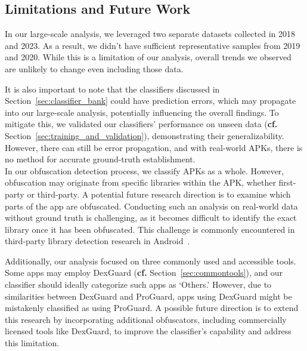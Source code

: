 \subsection{Limitations and Future Work}
\label{sec:limitations}
 In our large-scale analysis, we leveraged two separate datasets collected in 2018 and 2023. As a result, we didn't have sufficient representative samples from 2019 and 2020. While this is a limitation of our analysis, overall trends we observed are unlikely to change even including those data.

It is also important to note that the classifiers discussed in Section~\ref{sec:classifier_bank} could have prediction errors, which may propagate into our large-scale analysis, potentially influencing the overall findings. To mitigate this, we validated our classifiers' performance on unseen data ({\bf cf.} Section~\ref{sec:training_and_validation}), demonstrating their generalizability. However, there can still be error propagation, and with real-world APKs, there is no method for accurate ground-truth establishment. 
\\

 In our obfuscation detection process, we classify APKs as a whole. However, obfuscation may originate from specific libraries within the APK, whether first-party or third-party. A potential future research direction is to examine which parts of the app are obfuscated. Conducting such an analysis on real-world data without ground truth is challenging, as it becomes difficult to identify the exact library once it has been obfuscated. This challenge is commonly encountered in third-party library detection research in Android~\cite{wang2018orlis, zhan2020automated, zhang2019libid, wu2023libscan}.

Additionally, our analysis focused on three commonly used and accessible tools. Some apps may employ DexGuard ({\bf cf.} Section~\ref{sec:commontools}), and our classifier should ideally categorize such apps as ‘Others.’ However, due to similarities between DexGuard and ProGuard, apps using DexGuard might be mistakenly classified as using ProGuard. A possible future direction is to extend this research by incorporating additional obfuscators, including commercially licensed tools like DexGuard, to improve the classifier’s capability and address this limitation. 
